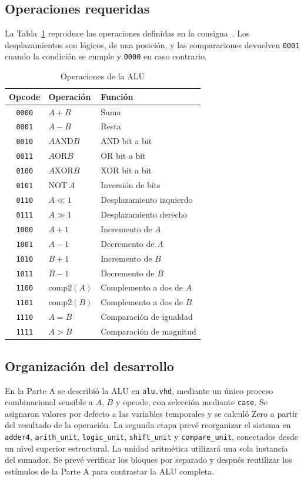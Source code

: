 \subsection{Operaciones requeridas}
La Tabla~\ref{tab:operaciones} reproduce las operaciones definidas
en la consigna~\cite{guialab2}. Los desplazamientos son lógicos,
de una posición, y las comparaciones devuelven \texttt{0001}
cuando la condición se cumple y \texttt{0000} en caso contrario.

\begin{table}[htbp]
\centering
\caption{Operaciones de la ALU}
\label{tab:operaciones}
\small
\begin{tabular}{cll}
\toprule
Opcode & Operación & Función\\
\midrule
\texttt{0000} & $A+B$ & Suma\\
\texttt{0001} & $A-B$ & Resta\\
\texttt{0010} & $A\mathbin{\mathrm{AND}}B$ & AND bit a bit\\
\texttt{0011} & $A\mathbin{\mathrm{OR}}B$ & OR bit a bit\\
\texttt{0100} & $A\mathbin{\mathrm{XOR}}B$ & XOR bit a bit\\
\texttt{0101} & $\mathrm{NOT}\ A$ & Inversión de bits\\
\texttt{0110} & $A\ll1$ & Desplazamiento izquierdo\\
\texttt{0111} & $A\gg1$ & Desplazamiento derecho\\
\texttt{1000} & $A+1$ & Incremento de $A$\\
\texttt{1001} & $A-1$ & Decremento de $A$\\
\texttt{1010} & $B+1$ & Incremento de $B$\\
\texttt{1011} & $B-1$ & Decremento de $B$\\
\texttt{1100} & $\mathrm{comp2}(A)$ & Complemento a dos de $A$\\
\texttt{1101} & $\mathrm{comp2}(B)$ & Complemento a dos de $B$\\
\texttt{1110} & $A=B$ & Comparación de igualdad\\
\texttt{1111} & $A>B$ & Comparación de magnitud\\
\bottomrule
\end{tabular}
\end{table}

\subsection{Organización del desarrollo}
En la Parte A se describió la ALU en \texttt{alu.vhd}, mediante un
único proceso combinacional sensible a $A$, $B$ y opcode, con
selección mediante \texttt{case}. Se asignaron valores por defecto
a las variables temporales y se calculó Zero a partir del resultado
de la operación. La segunda etapa prevé reorganizar el sistema en \texttt{adder4},
\texttt{arith\_unit}, \texttt{logic\_unit}, \texttt{shift\_unit}
y \texttt{compare\_unit}, conectados desde un nivel superior
estructural. La unidad aritmética utilizará una sola instancia
del sumador. Se prevé verificar los bloques por separado y después
reutilizar los estímulos de la Parte A para contrastar la ALU completa.

